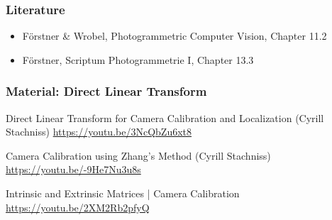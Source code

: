 \begin{frame}
  \frametitle{Literature}
  \begin{itemize}
    \item Förstner \& Wrobel, Photogrammetric Computer Vision, Chapter 11.2
    \item Förstner, Scriptum Photogrammetrie I, Chapter 13.3
  \end{itemize}
\end{frame}

\begin{frame}
  \frametitle{Material: Direct Linear Transform}

  Direct Linear Transform for Camera Calibration and Localization (Cyrill Stachniss)
  \url{https://youtu.be/3NcQbZu6xt8}

  Camera Calibration using Zhang's Method (Cyrill Stachniss)
  \url{https://youtu.be/-9He7Nu3u8s}

  Intrinsic and Extrinsic Matrices | Camera Calibration
  \url{https://youtu.be/2XM2Rb2pfyQ}

\end{frame}
